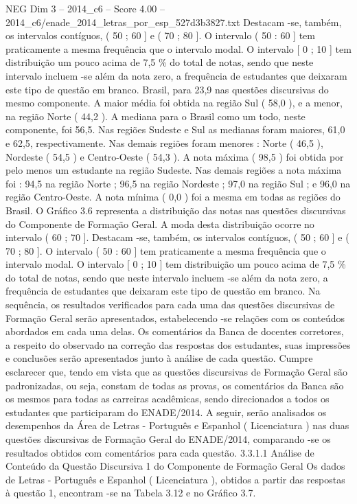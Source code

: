 \begin{textsample}{NEG Dim 3 – 2014\_c6 – Score 4.00 – 2014\_c6/enade\_2014\_letras\_por\_esp\_527d3b3827.txt}
Destacam -se, também, os intervalos contíguos, ( 50 ; 60 ] e ( 70 ; 80 ].
O intervalo ( 50 : 60 ] tem praticamente a mesma frequência que o intervalo modal.
O intervalo [ 0 ; 10 ] tem distribuição um pouco acima de 7,5 \% do total de notas, sendo que neste intervalo incluem -se além da nota zero, a frequência de estudantes que deixaram este tipo de questão em branco.
Brasil, para 23,9 nas questões discursivas do mesmo componente.
A maior média foi obtida na região Sul ( 58,0 ), e a menor, na região Norte ( 44,2 ).
A mediana para o Brasil como um todo, neste componente, foi 56,5.
Nas regiões Sudeste e Sul as medianas foram maiores, 61,0 e 62,5, respectivamente.
Nas demais regiões foram menores : Norte ( 46,5 ), Nordeste ( 54,5 ) e Centro-Oeste ( 54,3 ).
A nota máxima ( 98,5 ) foi obtida por pelo menos um estudante na região Sudeste.
Nas demais regiões a nota máxima foi : 94,5 na região Norte ; 96,5 na região Nordeste ; 97,0 na região Sul ; e 96,0 na região Centro-Oeste.
A nota mínima ( 0,0 ) foi a mesma em todas as regiões do Brasil.
O Gráfico 3.6 representa a distribuição das notas nas questões discursivas do Componente de Formação Geral.
A moda desta distribuição ocorre no intervalo ( 60 ; 70 ].
Destacam -se, também, os intervalos contíguos, ( 50 ; 60 ] e ( 70 ; 80 ].
O intervalo ( 50 : 60 ] tem praticamente a mesma frequência que o intervalo modal.
O intervalo [ 0 ; 10 ] tem distribuição um pouco acima de 7,5 \% do total de notas, sendo que neste intervalo incluem -se além da nota zero, a frequência de estudantes que deixaram este tipo de questão em branco.
Na sequência, os resultados verificados para cada uma das questões discursivas de Formação Geral serão apresentados, estabelecendo -se relações com os conteúdos abordados em cada uma delas.
Os comentários da Banca de docentes corretores, a respeito do observado na correção das respostas dos estudantes, suas impressões e conclusões serão apresentados junto à análise de cada questão.
Cumpre esclarecer que, tendo em vista que as questões discursivas de Formação Geral são padronizadas, ou seja, constam de todas as provas, os comentários da Banca são os mesmos para todas as carreiras acadêmicas, sendo direcionados a todos os estudantes que participaram do ENADE/2014.
A seguir, serão analisados os desempenhos da Área de Letras - Português e Espanhol ( Licenciatura ) nas duas questões discursivas de Formação Geral do ENADE/2014, comparando -se os resultados obtidos com comentários para cada questão. 3.3.1.1 Análise de Conteúdo da Questão Discursiva 1 do Componente de Formação Geral Os dados de Letras - Português e Espanhol ( Licenciatura ), obtidos a partir das respostas à questão 1, encontram -se na Tabela 3.12 e no Gráfico 3.7.

\end{textsample}
